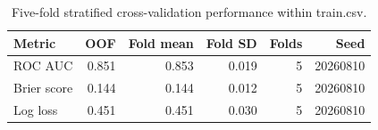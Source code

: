 \begin{table}[htbp]
\centering
\caption{Five-fold stratified cross-validation performance within train.csv.}
\label{tab:model-performance}
\small
\begin{tabular}{lrrrrr}
\toprule
Metric & OOF & Fold mean & Fold SD & Folds & Seed \\
\midrule
ROC AUC & 0.851 & 0.853 & 0.019 & 5 & 20260810 \\
Brier score & 0.144 & 0.144 & 0.012 & 5 & 20260810 \\
Log loss & 0.451 & 0.451 & 0.030 & 5 & 20260810 \\
\bottomrule
\end{tabular}
\end{table}
